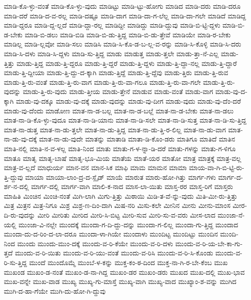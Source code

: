 {ಮಾಡಿ-ಕೊ-ಳ್ಳು-ವಂತೆ
ಮಾಡಿ-ಕೊ-ಳ್ಳು-ವುದು
ಮಾಡಿಟ್ಟು
ಮಾಡಿ-ಟ್ಟು-ಹೋಗು
ಮಾಡಿದ
ಮಾಡಿ-ದರು
ಮಾಡಿ-ದರೂ
ಮಾಡಿ-ದರೆ
ಮಾಡಿ-ದ-ವ-ರಲ್ಲ
ಮಾಡಿ-ದಷ್ಟೂ
ಮಾಡಿ-ದಾಗ
ಮಾಡಿ-ದಾ-ಗ-ಲೆಲ್ಲ
ಮಾಡಿ-ದಾ-ಗಲೇ
ಮಾಡಿದೆ
ಮಾಡಿದ್ದ
ಮಾಡಿ-ದ್ದರೂ
ಮಾಡಿ-ದ್ದ-ಲ್ಲದೆ
ಮಾಡಿ-ದ್ದಾ-ರಲ್ಲ
ಮಾಡಿದ್ದೀ
ಮಾಡಿದ್ದು
ಮಾಡಿ-ದ್ದುವು
ಮಾಡಿ-ಬಿ-ಟ್ಟಿ-ದ್ದಳು
ಮಾಡಿ-ಬಿ-ಡ-ಬೇಕು
ಮಾಡಿ-ಬಿ-ಡಲು
ಮಾಡಿ-ಬಿಡಿ
ಮಾಡಿ-ಬಿ-ಡು-ತ್ತಿದ್ದ
ಮಾಡಿ-ಬಿ-ಡು-ತ್ತೇವೆ
ಮಾಡಿಯೇ
ಮಾಡಿ-ರ-ಬೇಕು
ಮಾಡಿಲ್ಲ
ಮಾಡಿ-ಲ್ಲವೋ
ಮಾಡಿ-ಸಲು
ಮಾಡಿಸಿ
ಮಾಡಿ-ಸಿ-ಕೊ-ಡ-ಬ-ಲ್ಲ-ವ-ರನ್ನು
ಮಾಡಿ-ಸಿ-ಕೊಳ್ಳಿ
ಮಾಡಿ-ಸಿ-ದರು
ಮಾಡಿ-ಸಿ-ದಳು
ಮಾಡಿ-ಸಿ-ದ್ದಳು
ಮಾಡಿ-ಸು-ತ್ತಿದ್ದ
ಮಾಡು
ಮಾಡುತ್ತ
ಮಾಡು-ತ್ತಲೇ
ಮಾಡು-ತ್ತಾ-ನೆ-ಎಲ್ಲ
ಮಾಡು-ತ್ತಿತ್ತು
ಮಾಡು-ತ್ತಿದ್ದ
ಮಾಡು-ತ್ತಿ-ದ್ದರೂ
ಮಾಡು-ತ್ತಿ-ದ್ದರೆ
ಮಾಡು-ತ್ತಿ-ದ್ದಳು
ಮಾಡು-ತ್ತಿ-ದ್ದಾ-ನಲ್ಲ
ಮಾಡು-ತ್ತಿ-ದ್ದಾರೆ
ಮಾಡು-ತ್ತಿ-ದ್ದೀಯಾ
ಮಾಡು-ತ್ತಿ-ದ್ದು-ದ-ಕ್ಕಾಗಿ
ಮಾಡು-ತ್ತಿದ್ದೆ
ಮಾಡು-ತ್ತಿ-ದ್ದೆವು
ಮಾಡು-ತ್ತಿರು
ಮಾಡು-ತ್ತಿ-ರುವ
ಮಾಡು-ತ್ತಿ-ರು-ವಂತೆ
ಮಾಡು-ತ್ತಿ-ರು-ವಾಗ
ಮಾಡು-ತ್ತಿ-ರು-ವಾ-ಗಲೂ
ಮಾಡು-ತ್ತಿ-ರು-ವಾ-ಗಲೇ
ಮಾಡು-ತ್ತಿ-ರು-ವುದನ್ನು
ಮಾಡು-ತ್ತಿ-ರು-ವುದು
ಮಾಡು-ತ್ತೀಯ
ಮಾಡು-ತ್ತೇನೆ
ಮಾಡುವ
ಮಾಡು-ವಂತೆ
ಮಾಡು-ವಾಗ
ಮಾಡು-ವು-ದ-ಕ್ಕಾಗಿ
ಮಾಡು-ವು-ದಕ್ಕೂ
ಮಾಡು-ವು-ದಕ್ಕೆ
ಮಾಡು-ವುದನ್ನು
ಮಾಡು-ವು-ದೀಗ
ಮಾಡು-ವುದು
ಮಾಡು-ವು-ದೆಂ-ದರೆ
ಮಾಡು-ವು-ದೆಂದು
ಮಾಡೋಣ
ಮಾತ-ನಾ-ಡ-ಬಲ್ಲ
ಮಾತ-ನಾ-ಡ-ಬಲ್ಲೆ
ಮಾತ-ನಾ-ಡ-ಬೇಕು
ಮಾತ-ನಾ-ಡಲು
ಮಾತ-ನಾ-ಡಿ-ಕೊ-ಳ್ಳು-ವುದೂ
ಮಾತ-ನಾ-ಡಿ-ಯಾನು
ಮಾತ-ನಾ-ಡಿ-ಸಲೇ
ಮಾತ-ನಾ-ಡಿ-ಸುತ್ತ
ಮಾತ-ನಾ-ಡಿ-ಸು-ತ್ತಿದ್ದ
ಮಾತ-ನಾ-ಡುತ್ತ
ಮಾತ-ನಾ-ಡು-ತ್ತಲೇ
ಮಾತ-ನಾ-ಡು-ತ್ತಿದ್ದ
ಮಾತ-ನಾ-ಡು-ತ್ತಿ-ರ-ಲಿಲ್ಲ
ಮಾತ-ನಾ-ಡು-ವಾಗ
ಮಾತ-ನಾ-ಡು-ವು-ದಕ್ಕೆ
ಮಾತ-ನಾ-ಡು-ವುದೇ
ಮಾತನ್ನು
ಮಾತಾಡಿ
ಮಾತಾ-ಡಿ-ಕೊಂ-ಡರು
ಮಾತಿಗೂ
ಮಾತಿದೆ
ಮಾತಿನ
ಮಾತಿ-ನಲ್ಲಿ
ಮಾತಿ-ನ-ವ-ಳಲ್ಲ
ಮಾತಿ-ನಿಂದ
ಮಾತು
ಮಾತು-ಗ-ಳ-ನ್ನಾ-ಡಿ-ದರೆ
ಮಾತು-ಗಳನ್ನು
ಮಾತು-ಗ-ಳಿಗೂ
ಮಾತೂ
ಮಾತೃ
ಮಾತೃ-ಬಾಷೆ
ಮಾತೃ-ಭೂ-ಮಿಯ
ಮಾತೆಯ
ಮಾತೆ-ಯರ
ಮಾತೋ
ಮಾತ್ರ
ಮಾತ್ರಕ್ಕೆ
ಮಾತ್ರ-ವಲ್ಲ
ಮಾತ್ರ-ವ-ಲ್ಲದೆ
ಮಾಧುರ್ಯ
ಮಾನ-ವನ
ಮಾನ-ಸಿಕ
ಮಾಫಿ
ಮಾಮ
ಮಾಮನ
ಮಾಮಾ
ಮಾಯ-ವಾ-ಗಿ-ಬಿ-ಟ್ಟಿ-ರು-ತ್ತಿ-ದ್ದುವು
ಮಾಯಾ
ಮಾಯಾ-ಲಾಂ-ದ್ರ-ದ-ಸ್ಲೈಡ್
ಮಾಯೆ
ಮಾರುತ
ಮಾರು-ಹೋ-ಗಿತ್ತು
ಮಾರ್ಗ-ಗಳು
ಮಾರ್ಗ-ದ-ರ್ಶ-ನ-ದಲ್ಲಿ
ಮಾರ್ಗ-ದಲ್ಲಿ
ಮಾರ್ಗ-ವಾಗಿ
ಮಾಲಿ-ಕ-ನಾದ
ಮಾಸ-ಲಾ-ಯಿತು
ಮಾಸ್ತ-ರರ
ಮಾಸ್ತ-ರಿಗೆ
ಮಾಸ್ತರು
ಮಾಹಿತಿ
ಮಿಂಚಿನ
ಮಿಂಚಿ-ನಂತೆ
ಮಿಗಿ-ಲಾಗಿ
ಮಿಗು-ತ್ತಿತ್ತು
ಮಿಠಾಯಿ
ಮಿಡಿ-ತ-ವೆ-ನ್ನು-ವುದು
ಮಿತಿ-ಮೀ-ರು-ತ್ತಿತ್ತು
ಮಿತ್ರ
ಮಿತ್ರನ
ಮಿತ್ರ-ನಿಗೂ
ಮಿಶ್ರ
ಮಿಶ್ರ-ಣ-ದಿಂ-ದಾಗಿ
ಮಿಷ-ನರಿ
ಮಿಸು-ಕಲೇ
ಮೀನಿನ
ಮೀನು
ಮೀನು-ಮಾಂಸ
ಮೀರ-ದಿ-ರು-ವುದನ್ನು
ಮೀರಿ
ಮೀರಿತು
ಮೀರಿದ
ಮೀರಿ-ಸಿ-ಬಿಟ್ಟ
ಮೀರಿ-ಸುವ
ಮೀರಿ-ಸು-ವ-ವರು
ಮೀಸ-ಲಾದ
ಮುಂಜಾ-ನೆ-ಯಲ್ಲಿ
ಮುಂಜಾ-ವಿ-ನಲ್ಲೇ
ಮುಂದಕ್ಕೆ
ಮುಂದಾ-ಗ-ದಿ-ದ್ದು-ದನ್ನು
ಮುಂದಾ-ಗ-ಲಿಲ್ಲ
ಮುಂದಾ-ಗು-ತ್ತಿದ್ದ
ಮುಂದಾದ
ಮುಂದಾ-ದು-ದ-ರಿಂ-ದ-ಲಾ-ದರೂ
ಮುಂದಾ-ಳಾ-ಗಿಯೇ
ಮುಂದಾಳು
ಮುಂದಿಟ್ಟ
ಮುಂದಿಟ್ಟು
ಮುಂದಿನ
ಮುಂದಿ-ನಿಂದ
ಮುಂದು
ಮುಂದು-ಮುಂ-ದಕ್ಕೆ
ಮುಂದು-ವ-ರಿ-ಕೆಯೇ
ಮುಂದು-ವ-ರಿ-ದಳು
ಮುಂದು-ವ-ರಿ-ಯ-ಬೇ-ಕಾ-ಗು-ತ್ತದೆ
ಮುಂದು-ವ-ರಿ-ಯಿತು
ಮುಂದು-ವ-ರಿ-ಯು-ವಂತೆ
ಮುಂದು-ವ-ರಿಸಿ
ಮುಂದು-ವ-ರಿ-ಸಿ-ಕೊಂಡು
ಮುಂದು-ವ-ರಿ-ಸು-ತ್ತಿದ್ದ
ಮುಂದೆ
ಮುಂದೊಮ್ಮೆ
ಮುಂಬೆ-ಳ-ಕನ್ನು
ಮುಕ್ತ-ಕಂ-ಠ-ದಿಂದ
ಮುಕ್ತ-ನಾ-ಗಿ-ರ-ಬೇ-ಕೆಂಬ
ಮುಖ
ಮುಖಂಡ
ಮುಖಂ-ಡ-ನಂತೆ
ಮುಖಂ-ಡ-ನಾ-ಗಿದ್ದ
ಮುಖಂ-ಡರ
ಮುಖಂ-ಡರು
ಮುಖದ
ಮುಖ-ದಲ್ಲಿ
ಮುಖ-ಭಾವ
ಮುಖ-ವನ್ನೇ
ಮುಖ-ವಾಡ
ಮುಖ್ಯ
ಮುಖ್ಯ-ಗು-ಮಾಸ್ತೆ
ಮುಖ್ಯ-ವಾಗಿ
ಮುಖ್ಯ-ವಾದ
ಮುಖ್ಯಾಂ-ಶ-ವನ್ನು
ಮುಗಿದ
ಮುಗಿ-ದ-ಹಾ-ಗೆಯೇ
ಮುಗಿ-ದು-ಹೋ-ಗಿ-ದ್ದುವು
}
